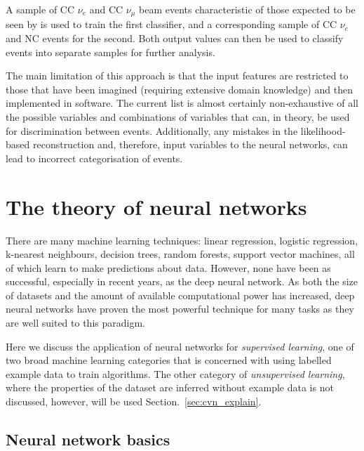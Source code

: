 A sample of CC $\nu_{e}$ and CC $\nu_{\mu}$ beam events characteristic of those expected to be
seen by \chips is used to train the first classifier, and a corresponding sample of CC $\nu_{e}$
and NC events for the second. Both output values can then be used to classify events into separate
samples for further analysis.

The main limitation of this approach is that the input features are restricted to those that have
been imagined (requiring extensive domain knowledge) and then implemented in software. The current
list is almost certainly non-exhaustive of all the possible variables and combinations of
variables that can, in theory, be used for discrimination between events. Additionally, any
mistakes in the likelihood-based reconstruction and, therefore, input variables to the neural
networks, can lead to incorrect categorisation of events.

\section{The theory of neural networks} %
\label{sec:cvn_theory} %

There are many machine learning techniques: linear regression, logistic regression, k-nearest
neighbours, decision trees, random forests, support vector machines, all of which learn to make
predictions about data. However, none have been as successful, especially in recent years, as the
deep neural network. As both the size of datasets and the amount of available computational power
has increased, deep neural networks have proven the most powerful technique for many tasks as they
are well suited to this paradigm.

Here we discuss the application of neural networks for \emph{supervised learning}, one of two
broad machine learning categories that is concerned with using labelled example data to train
algorithms. The other category of \emph{unsupervised learning}, where the properties of the dataset are inferred without example data is not discussed, however, will be used
Section.~\ref{sec:cvn_explain}.

\subsection{Neural network basics} %
\label{sec:cvn_theory_basics} %

